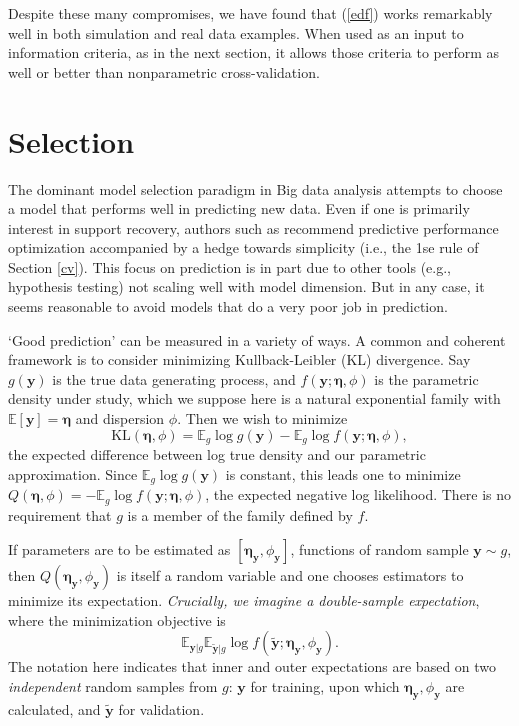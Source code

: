 \documentclass[12pt]{article}
\newcommand{\bs}[1]{\boldsymbol{#1}}
\newcommand{\mr}[1]{\mathrm{#1}}
\newcommand{\bm}[1]{\mathbf{#1}}
\newcommand{\ds}[1]{\mathds{#1}}
\begin{document}
Despite these many compromises, we have found that (\ref{edf}) works remarkably
well in both simulation and real data examples.  When used as an input to
information criteria, as in the next section, it allows those criteria to
perform as well or better than nonparametric cross-validation.

\section{Selection}
\label{selection}


The dominant model selection paradigm in Big data analysis attempts to choose
 a model that performs well in predicting new data. Even if one is primarily
 interest in support recovery, authors such as \cite{hastie_elements_2009}
 recommend predictive performance optimization accompanied by a hedge towards
 simplicity (i.e., the 1se rule of Section \ref{cv}).  This focus on
 prediction is in part due to other tools (e.g., hypothesis testing) not
 scaling well with model dimension.  But in any case, it seems reasonable to
 avoid models that do a very poor job in prediction.

`Good prediction' can be measured in a variety of ways.  A common and coherent framework is to consider minimizing Kullback-Leibler (KL) divergence.  Say $g(\bm{y})$ is the true data generating process, and $f(\bm{y}; \bs{\eta},\phi)$ is the parametric density under study, which we suppose here is a natural exponential family  with $\ds{E}[\bm{y}]=\bs{\eta}$ and dispersion $\phi$. Then we wish to minimize
\begin{equation}
\mr{KL}(\bs{\eta},\phi) = \ds{E}_g \log g(\bm{y}) - \ds{E}_g \log f(\bm{y}; \bs{\eta},\phi),
\end{equation}
the expected difference between log true density and our parametric approximation.  Since $\ds{E}_g \log g(\bm{y})$ is constant, this leads one to minimize 
$Q(\bs{\eta},\phi) = -\ds{E}_g \log f(\bm{y}; \bs{\eta},\phi)$, the expected negative log likelihood.   There is no requirement that $g$ is a member of the family defined by $f$.

If parameters are to be estimated as $[\bs{\eta}_{\bm{y}},\phi_{\bm{y}}]$, functions of random sample $\bm{y} \sim g$, then $Q(\bs{\eta}_{\bm{y}},\phi_{\bm{y}})$ is itself a random variable and one chooses estimators to minimize its expectation.  {\it Crucially, we imagine a double-sample expectation}, where the minimization objective is
\begin{equation}\label{dualexpect}
\ds{E}_{\bm{y}|g} \ds{E}_{\bm{\tilde y}|g} \log f(\bm{\tilde y}; \bs{\eta}_{\bm{y}},\phi_{\bm{y}}).
\end{equation}
The notation here indicates that inner and outer expectations are based on two {\it independent} random samples from $g$: $\bm{y}$ for training, upon which $\bs{\eta}_{\bm{y}},\phi_{\bm{y}}$ are calculated, and $\bm{\tilde y}$ for validation.  
\end{document}
